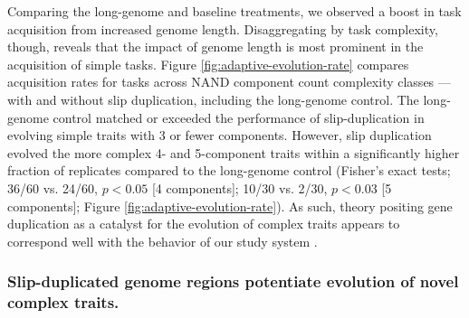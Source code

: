 Comparing the long-genome and baseline treatments, we observed a boost in task acquisition from increased genome length.
Disaggregating by task complexity, though, reveals that the impact of genome length is most prominent in the acquisition of simple tasks.
Figure \ref{fig:adaptive-evolution-rate} compares acquisition rates for tasks across NAND component count complexity classes --- with and without slip duplication, including the long-genome control.
The long-genome control matched or exceeded the performance of slip-duplication in evolving simple traits with 3 or fewer components.
However, slip duplication evolved the more complex 4- and 5-component traits within a significantly higher fraction of replicates compared to the long-genome control (Fisher's exact tests; 36/60 vs. 24/60, $p<0.05$ [4 components]; 10/30 vs. 2/30, $p<0.03$ [5 components]; Figure \ref{fig:adaptive-evolution-rate}).
As such, theory positing gene duplication as a catalyst for the evolution of complex traits appears to correspond well with the  behavior of our study system \citep{ohno1970evolution}.

\subsubsection{Slip-duplicated genome regions potentiate evolution of novel complex traits.}

